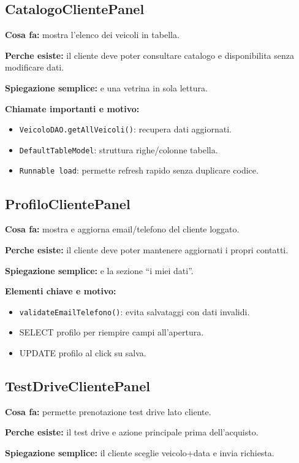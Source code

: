 \documentclass[12pt,a4paper]{article}
\begin{document}
\subsection{CatalogoClientePanel}
\textbf{Cosa fa:} mostra l'elenco dei veicoli in tabella.

\textbf{Perche esiste:} il cliente deve poter consultare catalogo e disponibilita senza modificare dati.

\textbf{Spiegazione semplice:} e una vetrina in sola lettura.

\textbf{Chiamate importanti e motivo:}
\begin{itemize}
  \item \texttt{VeicoloDAO.getAllVeicoli()}: recupera dati aggiornati.
  \item \texttt{DefaultTableModel}: struttura righe/colonne tabella.
  \item \texttt{Runnable load}: permette refresh rapido senza duplicare codice.
\end{itemize}

\subsection{ProfiloClientePanel}
\textbf{Cosa fa:} mostra e aggiorna email/telefono del cliente loggato.

\textbf{Perche esiste:} il cliente deve poter mantenere aggiornati i propri contatti.

\textbf{Spiegazione semplice:} e la sezione ``i miei dati''.

\textbf{Elementi chiave e motivo:}
\begin{itemize}
  \item \texttt{validateEmailTelefono()}: evita salvataggi con dati invalidi.
  \item SELECT profilo per riempire campi all'apertura.
  \item UPDATE profilo al click su salva.
\end{itemize}

\subsection{TestDriveClientePanel}
\textbf{Cosa fa:} permette prenotazione test drive lato cliente.

\textbf{Perche esiste:} il test drive e azione principale prima dell'acquisto.

\textbf{Spiegazione semplice:} il cliente sceglie veicolo+data e invia richiesta.
\end{document}
